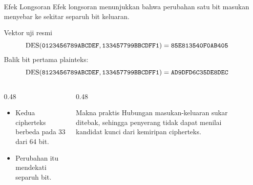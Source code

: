 \documentclass[aspectratio=169,11pt]{beamer}
\begin{document}
\begin{frame}{Efek Longsoran}
    \footnotesize
    Efek longsoran menunjukkan bahwa perubahan satu bit masukan menyebar
    ke sekitar separuh bit keluaran.
    \begin{exampleblock}{Vektor uji resmi}
        \footnotesize
        \[
            \mathrm{DES}(\texttt{0123456789ABCDEF},
            \texttt{133457799BBCDFF1})
            = \texttt{85E813540F0AB405}
        \]
        Balik bit pertama plainteks:
        \[
            \mathrm{DES}(\texttt{8123456789ABCDEF},
            \texttt{133457799BBCDFF1})
            = \texttt{AD9DFD6C35DE8DEC}
        \]
    \end{exampleblock}
    \begin{columns}[T,onlytextwidth]
        \begin{column}{0.48\textwidth}
            \begin{itemize}
                \item Kedua cipherteks berbeda pada 33 dari 64 bit.
                \item Perubahan itu mendekati separuh bit.
            \end{itemize}
        \end{column}
        \begin{column}{0.48\textwidth}
            \begin{block}{Makna praktis}
                \footnotesize
                Hubungan masukan-keluaran sukar ditebak, sehingga
                penyerang tidak dapat menilai kandidat kunci dari
                kemiripan cipherteks.
            \end{block}
        \end{column}
    \end{columns}
\end{frame}
\end{document}
